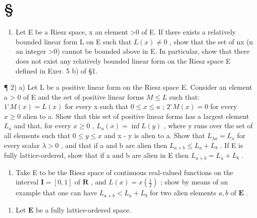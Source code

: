 \section*{\texorpdfstring{\S\CurrentExerciseGroup}{Section \CurrentExerciseGroup}}
{}

\begin{enumerate}
\def\labelenumi{\arabic{enumi})}
\tightlist
\item
  Let E be a Riesz space, x an element \textgreater0 of E. If there exists a relatively bounded linear form L on E such that \(L(x) \neq 0\) , show that the set of nx (n an integer \textgreater0) cannot be bounded above in E. In particular, show that there does not exist any relatively bounded linear form on the Riesz space E defined in Exer. 5 b) of §1.
\end{enumerate}

¶ 2) a) Let L be a positive linear form on the Riesz space E. Consider an element a \textgreater{} 0 of E and the set of positive linear forms \(M \leqslant L\) such that: \(1^{\circ} M(x) = L(x)\) for every x such that \(0 \leqslant x \leqslant a\) ; \(2^{\circ} M(x) = 0\) for every \(x \geqslant 0\) alien to a. Show that this set of positive linear forms has a largest element \(L_{a}\) and that, for every \(x \geqslant 0\) , \(L_{a}(x) = \inf L(y)\) , where y runs over the set of all elements such that \(0 \leqslant y \leqslant x\) and x - y is alien to a. Show that \(L_{\lambda a} = L_{a}\) for every scalar \(\lambda > 0\) , and that if a and b are alien then \(L_{a+b} \leqslant L_{a} + L_{b}\) . If E is fully lattice-ordered, show that if a and b are alien in E then \(L_{a+b} = L_{a} + L_{b}\) .

\begin{enumerate}
\def\labelenumi{\alph{enumi})}
\setcounter{enumi}{1}
\tightlist
\item
  Take E to be the Riesz space of continuous real-valued functions on the interval \(\mathbf{I} = [0,1]\) of \(\mathbf{R}\) , and \(L(x) = x\left(\frac{1}{2}\right)\) ; show by means of an example that one can have \(L_{a + b} < L_a + L_b\) for two alien elements \(a, b\) of \(\mathbf{E}\) .
\end{enumerate}

\begin{enumerate}
\def\labelenumi{\arabic{enumi})}
\setcounter{enumi}{2}
\tightlist
\item
  Let \(\mathbf{E}\) be a fully lattice-ordered space.
\end{enumerate}

